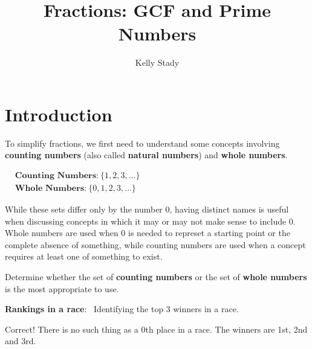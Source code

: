 \documentclass{ximera}[font=12pt]  %
\title{Fractions: GCF and Prime Numbers}   %
\author{Kelly Stady}
\begin{document}
\begin{abstract}

\end{abstract}

\maketitle

\label{xim:FactorsGCFPrime}

\section*{Introduction}

To simplify fractions, we first need to understand some concepts involving \textbf{counting numbers} (also called \textbf{natural numbers}) 
and \textbf{whole numbers}.


\begin{flushleft}
\hspace{5em} %
$\begin{aligned}
& \textbf{Counting Numbers:} \ \{1, 2, 3, \dots\} \\[1.5ex]
& \textbf{Whole Numbers:} \ \{0, 1, 2, 3, \dots\}
\end{aligned}$
\end{flushleft}


While these sets differ only by the number 0, having distinct names is useful when discussing concepts in which it may or
may not make sense to include 0.  Whole numbers are used when 0 is needed to represet a starting point or the complete absence of something, 
while counting numbers are used when a concept requires at least one of something to exist.  


\begin{problem}  
Determine whether the set of \textbf{counting numbers} or the set of \textbf{whole numbers} is the most appropriate to use.

    \begin{center}
        \textbf{Rankings in a race}: \ Identifying the top 3 winners in a race.
    \end{center}

\begin{multipleChoice}
\end{multipleChoice}
\begin{feedback}
    Correct! There is no such thing as a 0th place in a race. The winners are 1st, 2nd and 3rd.
\end{feedback}
\end{problem}
\end{document}
